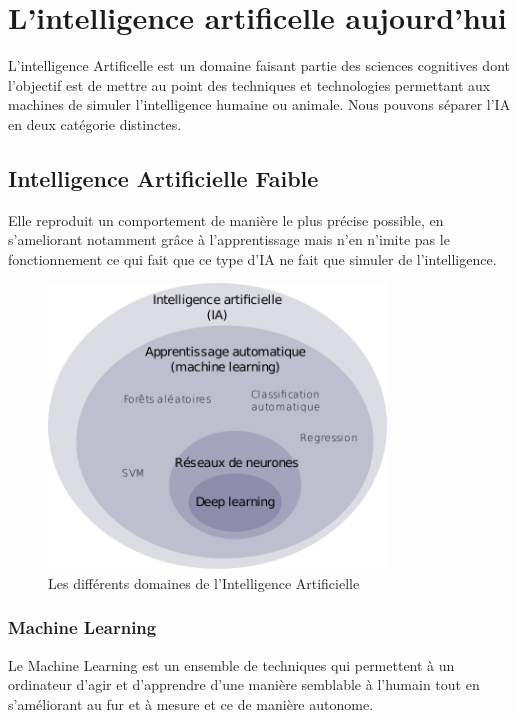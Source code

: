
\chapter{L'intelligence artificelle aujourd'hui}
L'intelligence Artificelle est un domaine faisant partie 
des sciences cognitives dont l'objectif est de mettre au
point des techniques et technologies permettant aux 
machines de simuler l'intelligence humaine ou animale.
Nous pouvons séparer l'IA en deux catégorie distinctes. 

\section{Intelligence Artificielle Faible}
Elle reproduit un comportement de manière le plus précise possible,
en s'ameliorant notamment grâce à l'apprentissage 
mais n'en n'imite pas le fonctionnement ce qui fait que
ce type d'IA ne fait que simuler de l'intelligence. \newline

\begin{figure}[!h]
    \centering
    \includegraphics[width=0.8\textwidth]{Images/aitype}
    \caption{Les différents domaines de l'Intelligence Artificielle}
	\label{fig:categorieIA}
\end{figure}


\subsection{Machine Learning}
Le Machine Learning est un ensemble de techniques qui permettent à un ordinateur 
d'agir et d'apprendre d'une manière semblable à l'humain tout en s'améliorant 
au fur et à mesure et ce de manière autonome.


